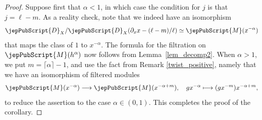 \begin{proof}
Suppose first that $\alpha<1$, in which case the condition for $j$ is that $j=\ell-m$. As a reality check, note that we indeed have an isomorphism
$$\jepPubScript{D}_X/\jepPubScript{D}_X(\partial_xx -(\ell-m)/\ell)\simeq \jepPubScript{M}(x^{-\alpha})$$
that maps the class of $1$ to $x^{-\alpha}$. 
The formula for the filtration on $\jepPubScript{M}(h^{\alpha})$ now follows from Lemma~\ref{lem_decomp2}.
When $\alpha>1$, we put $m=\lceil\alpha\rceil-1$, and use the fact from Remark \ref{twist_positive}, namely that we have an isomorphism of filtered modules
$$\jepPubScript{M}(x^{-\alpha})\longrightarrow\jepPubScript{M}(x^{-\alpha+m}),\quad gx^{-\alpha}\longmapsto (gx^{-m})x^{-\alpha+m},$$
to reduce the assertion to the case $\alpha\in (0,1)$.
This completes the proof of the corollary. 
\end{proof}




